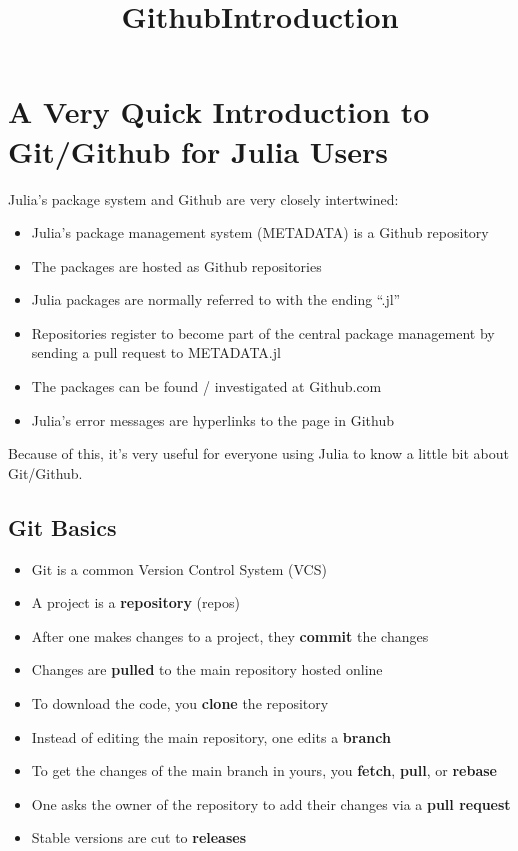 \documentclass[11pt]{article}
\title{GithubIntroduction}
\providecommand{\tightlist}{%
      \setlength{\itemsep}{0pt}\setlength{\parskip}{0pt}}
\begin{document}
    
    
    \maketitle
    
    

    
    \section{A Very Quick Introduction to Git/Github for Julia
Users}\label{a-very-quick-introduction-to-gitgithub-for-julia-users}

Julia's package system and Github are very closely intertwined:

\begin{itemize}
\tightlist
\item
  Julia's package management system (METADATA) is a Github repository
\item
  The packages are hosted as Github repositories
\item
  Julia packages are normally referred to with the ending ``.jl''
\item
  Repositories register to become part of the central package management
  by sending a pull request to METADATA.jl
\item
  The packages can be found / investigated at Github.com
\item
  Julia's error messages are hyperlinks to the page in Github
\end{itemize}

Because of this, it's very useful for everyone using Julia to know a
little bit about Git/Github.

    \subsection{Git Basics}\label{git-basics}

\begin{itemize}
\tightlist
\item
  Git is a common Version Control System (VCS)
\item
  A project is a \textbf{repository} (repos)
\item
  After one makes changes to a project, they \textbf{commit} the changes
\item
  Changes are \textbf{pulled} to the main repository hosted online
\item
  To download the code, you \textbf{clone} the repository
\item
  Instead of editing the main repository, one edits a \textbf{branch}
\item
  To get the changes of the main branch in yours, you \textbf{fetch},
  \textbf{pull}, or \textbf{rebase}
\item
  One asks the owner of the repository to add their changes via a
  \textbf{pull request}
\item
  Stable versions are cut to \textbf{releases}
\end{itemize}
\end{document}
